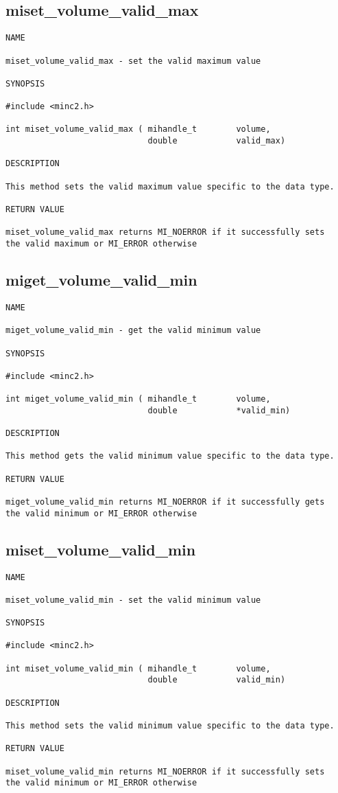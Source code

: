 \documentclass{article}
\begin{document}
\subsection{miset\_volume\_valid\_max}
\begin{verbatim}
NAME 

miset_volume_valid_max - set the valid maximum value 

SYNOPSIS

#include <minc2.h>

int miset_volume_valid_max ( mihandle_t        volume,
                             double            valid_max)
                                
DESCRIPTION

This method sets the valid maximum value specific to the data type.

RETURN VALUE

miset_volume_valid_max returns MI_NOERROR if it successfully sets 
the valid maximum or MI_ERROR otherwise
\end{verbatim}

\subsection{miget\_volume\_valid\_min}
\begin{verbatim}
NAME 

miget_volume_valid_min - get the valid minimum value 

SYNOPSIS

#include <minc2.h>

int miget_volume_valid_min ( mihandle_t        volume,
                             double            *valid_min)
                                
DESCRIPTION

This method gets the valid minimum value specific to the data type.

RETURN VALUE

miget_volume_valid_min returns MI_NOERROR if it successfully gets 
the valid minimum or MI_ERROR otherwise
\end{verbatim}

\subsection{miset\_volume\_valid\_min}
\begin{verbatim}
NAME 

miset_volume_valid_min - set the valid minimum value 

SYNOPSIS

#include <minc2.h>

int miset_volume_valid_min ( mihandle_t        volume,
                             double            valid_min)
                                
DESCRIPTION

This method sets the valid minimum value specific to the data type.

RETURN VALUE

miset_volume_valid_min returns MI_NOERROR if it successfully sets 
the valid minimum or MI_ERROR otherwise
\end{verbatim}
\end{document}

